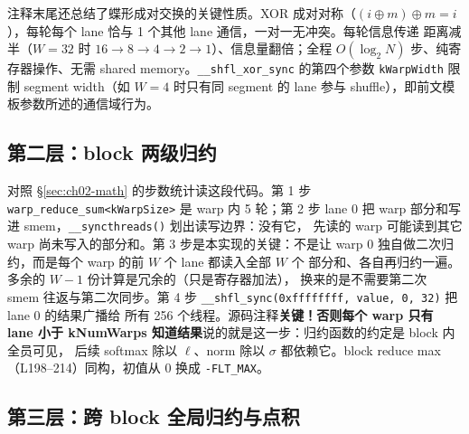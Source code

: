 注释末尾还总结了蝶形成对交换的关键性质。XOR 成对对称（$(i \oplus m) \oplus m
= i$），每轮每个 lane 恰与 1 个其他 lane 通信，一对一无冲突。每轮信息传递
距离减半（$W{=}32$ 时 $16 \to 8 \to 4 \to 2 \to 1$）、信息量翻倍；全程
$O(\log_2 N)$ 步、纯寄存器操作、无需 shared memory。\texttt{\_\_shfl\_xor\_sync}
的第四个参数 \texttt{kWarpWidth} 限制 segment width（如 $W{=}4$ 时只有同
segment 的 lane 参与 shuffle），即前文模板参数所述的通信域行为。

\subsection{第二层：block 两级归约}\label{sec:ch02-block}



对照 \S\ref{sec:ch02-math} 的步数统计读这段代码。第 1 步
\texttt{warp\_\allowbreak{}reduce\_\allowbreak{}sum\allowbreak{}<k\allowbreak{}Warp\allowbreak{}Size>} 是 warp 内 5 轮；第 2 步 lane 0 把
warp 部分和写进 smem，\texttt{\_\allowbreak{}\_\allowbreak{}syncthreads\allowbreak{}()} 划出读写边界：没有它，
先读的 warp 可能读到其它 warp 尚未写入的部分和。第 3 步是本实现的关键：不是让
warp 0 独自做二次归约，而是每个 warp 的前 $W$ 个 lane 都读入全部 $W$ 个
部分和、各自再归约一遍。多余的 $W-1$ 份计算是冗余的（只是寄存器加法），
换来的是不需要第二次 smem 往返与第二次同步。第 4 步
\texttt{\_\allowbreak{}\_\allowbreak{}shfl\_\allowbreak{}sync\allowbreak{}(0xffffffff,\allowbreak{} value,\allowbreak{} 0,\allowbreak{} 32)} 把 lane 0 的结果广播给
所有 256 个线程。源码注释\textbf{关键！否则每个 warp 只有 lane 小于
kNumWarps 知道结果}说的就是这一步：归约函数的约定是 block 内全员可见，
后续 softmax 除以 $\ell$、norm 除以 $\sigma$ 都依赖它。block reduce max
（L198--214）同构，初值从 0 换成 \texttt{-FLT\_MAX}。

\subsection{第三层：跨 block 全局归约与点积}\label{sec:ch02-global}






